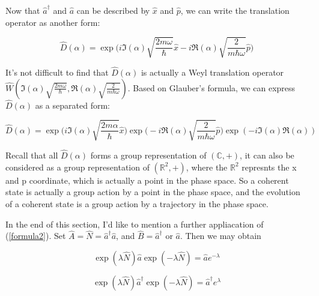 \documentclass{article}
\begin{document}
        \vbox{}

        \vbox{}

        Now that $\hat{a}^\dagger$ and $\hat{a}$ can be described by $\hat{x}$ and $\hat{p}$, we can write the translation operator as another form: 

        \begin{equation}\label{Weyl translation 1}
            \hat{D}(\alpha) = \exp\biggl(i\Im(\alpha)\sqrt{\frac{2m\omega}{\hbar}}\hat{x}-i\Re(\alpha)\sqrt{\frac{2}{m\hbar\omega}}\hat{p}\biggr)
        \end{equation}

        It's not difficult to find that $\hat{D}(\alpha)$ is actually a Weyl translation operator $\hat{W}(\Im(\alpha)\sqrt{\frac{2m\omega}{\hbar}}, \Re(\alpha)\sqrt{\frac{2}{m\hbar\omega}})$. Based on Glauber's formula, we can express $\hat{D}(\alpha)$ as a separated form:

        \begin{equation}\label{Weyl translation 2}
            \hat{D}(\alpha) = \exp\biggl(i\Im(\alpha)\sqrt{\frac{2m\alpha}{\hbar}}\hat{x}\biggr) \exp\biggl(-i\Re(\alpha)\sqrt{\frac{2}{m\hbar\omega}}\hat{p}\biggr) \exp(-i \Im(\alpha)\Re(\alpha))
        \end{equation}

        Recall that all $\hat{D}(\alpha)$ forms a group representation of $(\mathbb{C}, +)$, it can also be considered as a group representation of $(\mathbb{R}^2, +)$, where the $\mathbb{R}^2$ represnts the x and p coordinate, which is actually a point in the phase space. So a coherent state is actually a group action by a point in the phase space, and the evolution of a coherent state is a group action by a trajectory in the phase space.  

        \vbox{}

        \vbox{}

        In the end of this section, I'd like to mention a further appliacation of (\ref{formula2}). Set $\hat{A}=\hat{N}=\hat{a}^\dagger\hat{a}$, and $\hat{B}=\hat{a}^\dagger$ or $\hat{a}$. Then we may obtain

        \begin{equation}
            \exp(\lambda\hat{N})\hat{a}\exp(-\lambda\hat{N}) = \hat{a} e^{-\lambda}
        \end{equation}

        \begin{equation}
            \exp(\lambda\hat{N})\hat{a}^\dagger\exp(-\lambda\hat{N}) = \hat{a}^\dagger e^{\lambda}
        \end{equation}
\end{document}
